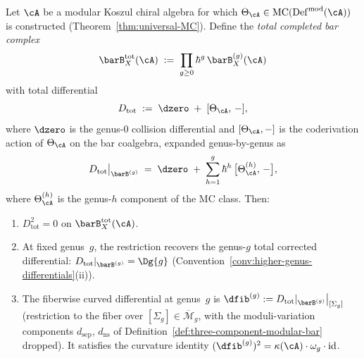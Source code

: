 \begin{theorem}\label{thm:total-differential-from-mc}
Let $\cA$ be a modular Koszul chiral algebra for which
$\Theta_\cA \in
\operatorname{MC}(\operatorname{Def}^{\mathrm{mod}}(\cA))$
is constructed
\textup{(}Theorem~\textup{\ref{thm:universal-MC})}.
Define the \emph{total completed bar complex}
\begin{equation}\label{eq:completed-bar-total}
\barB^{\mathrm{tot}}_X(\cA)
\;:=\;
\prod_{g \geq 0} \hbar^{g}\,
\barB_X^{(g)}(\cA)
\end{equation}
with total differential
\begin{equation}\label{eq:D-total-from-theta}
D_{\mathrm{tot}}
\;:=\;
\dzero \;+\; [\Theta_\cA,\, -],
\end{equation}
where $\dzero$ is the genus-$0$ collision differential and
$[\Theta_\cA, -]$ is the coderivation action of $\Theta_\cA$ on
the bar coalgebra, expanded genus-by-genus as
\begin{equation}\label{eq:D-total-expanded}
D_{\mathrm{tot}}\big|_{\barB^{(g)}}
\;=\;
\dzero \;+\;
\sum_{h=1}^{g} \hbar^{h}\,
\bigl[\Theta_\cA^{(h)},\, -\bigr],
\end{equation}
where $\Theta_\cA^{(h)}$ is the genus-$h$ component of the MC
class.
Then:
\begin{enumerate}[label=\textup{(\roman*)}]
\item $D_{\mathrm{tot}}^2 = 0$ on
  $\barB^{\mathrm{tot}}_X(\cA)$.
\item At fixed genus~$g$, the restriction recovers the
  genus-$g$ total corrected differential:
  $D_{\mathrm{tot}}|_{\barB^{(g)}} = \Dg{g}$
  \textup{(}Convention~\textup{\ref{conv:higher-genus-differentials}(ii))}.
\item The fiberwise curved differential at genus~$g$ is
  $\dfib^{(g)} := D_{\mathrm{tot}}|_{\barB^{(g)}}
  \big|_{[\Sigma_g]}$
  (restriction to the fiber over $[\Sigma_g] \in
  \overline{\mathcal{M}}_g$, with the moduli-variation components
  $d_{\mathrm{sep}}$, $d_{\mathrm{ns}}$ of
  Definition~\textup{\ref{def:three-component-modular-bar}}
  dropped).  It satisfies the curvature identity
  $(\dfib^{(g)})^2 = \kappa(\cA) \cdot \omega_g \cdot
  \operatorname{id}$.
\end{enumerate}
\end{theorem}

